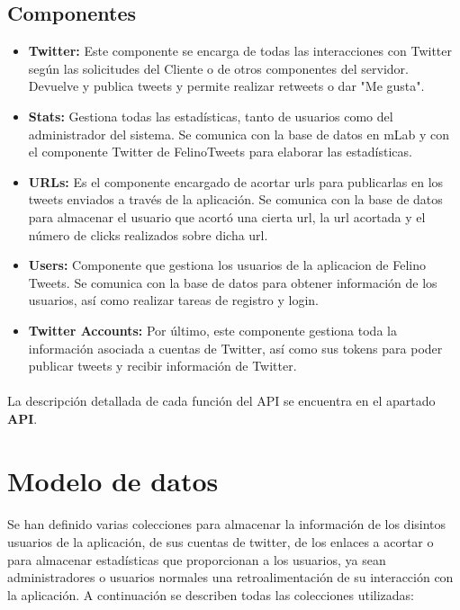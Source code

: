 \documentclass[a4paper]{article}
\begin{document}
	\subsection{Componentes}
		\begin{itemize}
			\item \textbf{Twitter:} Este componente se encarga de todas las interacciones con Twitter según las solicitudes del Cliente o de otros componentes del servidor. Devuelve y publica tweets y permite realizar retweets o dar "Me gusta".
			\item \textbf{Stats:} Gestiona todas las estadísticas, tanto de usuarios como del administrador del sistema. Se comunica con la base de datos en mLab y con el componente Twitter de FelinoTweets para elaborar las estadísticas.
			\item \textbf{URLs:} Es el componente encargado de acortar urls para publicarlas en los tweets enviados a través de la aplicación. Se comunica con la base de datos para almacenar el usuario que acortó una cierta url, la url acortada y el número de clicks realizados sobre dicha url.
			\item \textbf{Users:} Componente que gestiona los usuarios de la aplicacion de Felino Tweets. Se comunica con la base de datos para obtener información de los usuarios, así como realizar tareas de registro y login.
			\item \textbf{Twitter Accounts:} Por último, este componente gestiona toda la información asociada a cuentas de Twitter, así como sus tokens para poder publicar tweets y recibir información de Twitter.
		\end{itemize}
		\paragraph{} La descripción detallada de cada función del API se encuentra en el apartado \textbf{API}.

\section{Modelo de datos}

	\paragraph{} Se han definido varias colecciones para almacenar la información de los disintos usuarios de la aplicación, de sus cuentas de twitter, de los enlaces a acortar o para almacenar estadísticas que proporcionan a los usuarios, ya sean administradores o usuarios normales una retroalimentación de su interacción con la aplicación. A continuación se describen todas las colecciones utilizadas:
	
\end{document}
